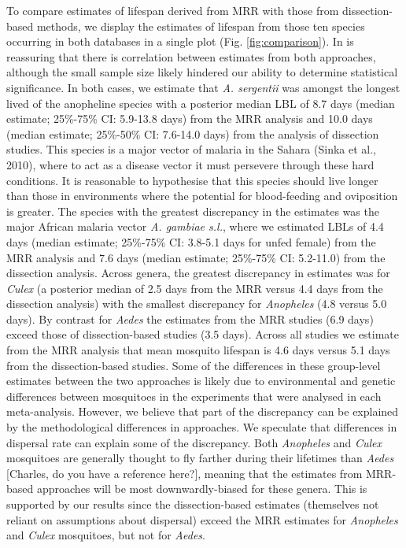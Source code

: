 \documentclass[]{article}
\begin{document}
To compare estimates of lifespan derived from MRR with those from
dissection-based methods, we display the estimates of lifespan from
those ten species occurring in both databases in a single plot (Fig. \ref{fig:comparison}). In is reassuring that there is correlation between estimates from both approaches, although the small sample size likely hindered our ability
to determine statistical significance. In both cases, we estimate that
\emph{A. sergentii} was amongst the longest lived of the anopheline
species with a posterior median LBL of 8.7 days (median estimate;
25\%-75\% CI: 5.9-13.8 days) from the MRR analysis and 10.0 days (median
estimate; 25\%-50\% CI: 7.6-14.0 days) from the analysis of dissection
studies. This species is a major vector of malaria in the Sahara (Sinka
et al., 2010), where to act as a disease vector it must persevere
through these hard conditions. It is reasonable to hypothesise that this
species should live longer than those in environments where the
potential for blood-feeding and oviposition is greater. The species with
the greatest discrepancy in the estimates was the major African malaria
vector \emph{A. gambiae s.l.}, where we estimated LBLs of 4.4 days
(median estimate; 25\%-75\% CI: 3.8-5.1 days for unfed female) from the
MRR analysis and 7.6 days (median estimate; 25\%-75\% CI: 5.2-11.0) from
the dissection analysis. Across genera, the greatest discrepancy in
estimates was for \emph{Culex} (a posterior median of 2.5 days from the
MRR versus 4.4 days from the dissection analysis) with the smallest
discrepancy for \emph{Anopheles} (4.8 versus 5.0 days). By contrast for
\emph{Aedes} the estimates from the MRR studies (6.9 days) exceed those
of dissection-based studies (3.5 days). Across all studies we estimate
from the MRR analysis that mean mosquito lifespan is 4.6 days versus 5.1
days from the dissection-based studies. Some of the differences in these
group-level estimates between the two approaches is likely due to
environmental and genetic differences between mosquitoes in the
experiments that were analysed in each meta-analysis. However, we
believe that part of the discrepancy can be explained by the
methodological differences in approaches. We speculate that differences
in dispersal rate can explain some of the discrepancy. Both
\emph{Anopheles} and \emph{Culex} mosquitoes are generally thought to
fly farther during their lifetimes than \emph{Aedes} {[}Charles, do you
have a reference here?{]}, meaning that the estimates from MRR-based
approaches will be most downwardly-biased for these genera. This is
supported by our results since the dissection-based estimates
(themselves not reliant on assumptions about dispersal) exceed the MRR
estimates for \emph{Anopheles} and \emph{Culex} mosquitoes, but not for
\emph{Aedes}.
\end{document}
